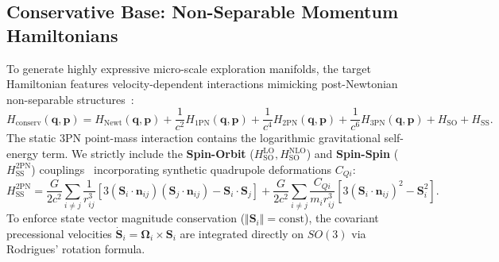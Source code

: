 \documentclass[11pt,a4paper,reqno]{article}
\theoremstyle{plain}
\theoremstyle{definition}
\theoremstyle{remark}
\numberwithin{equation}{section}
\begin{document}
\subsection{Conservative Base: Non-Separable Momentum Hamiltonians}
To generate highly expressive micro-scale exploration manifolds, the target Hamiltonian features velocity-dependent interactions mimicking post-Newtonian non-separable structures~\cite{DamourJaranowskiSchafer2008}:
\begin{equation}
H_{\mathrm{conserv}}(\bm{q}, \bm{p}) = H_{\mathrm{Newt}}(\bm{q}, \bm{p}) + \frac{1}{c^2} H_{\mathrm{1PN}}(\bm{q}, \bm{p}) + \frac{1}{c^4} H_{\mathrm{2PN}}(\bm{q}, \bm{p}) + \frac{1}{c^6} H_{\mathrm{3PN}}(\bm{q}, \bm{p}) + H_{\mathrm{SO}} + H_{\mathrm{SS}}.
\end{equation}
The static 3PN point-mass interaction contains the logarithmic gravitational self-energy term. We strictly include the \textbf{Spin-Orbit} ($H_{\mathrm{SO}}^{\mathrm{LO}}, H_{\mathrm{SO}}^{\mathrm{NLO}}$) and \textbf{Spin-Spin} ($H_{\mathrm{SS}}^{\mathrm{2PN}}$) couplings~\cite{Kidder1995} incorporating synthetic quadrupole deformations $C_{Qi}$:
\begin{equation}
H_{\mathrm{SS}}^{\mathrm{2PN}} = \frac{G}{2 c^2} \sum_{i \neq j} \frac{1}{r_{ij}^3} \left[ 3 (\bm{S}_i \cdot \bm{n}_{ij})(\bm{S}_j \cdot \bm{n}_{ij}) - \bm{S}_i \cdot \bm{S}_j \right] + \frac{G}{2 c^2} \sum_{i \neq j} \frac{C_{Qi}}{m_i r_{ij}^3} \left[ 3 (\bm{S}_i \cdot \bm{n}_{ij})^2 - \bm{S}_i^2 \right].
\end{equation}
To enforce state vector magnitude conservation ($\Vert\bm{S}_i\Vert = \text{const}$), the covariant precessional velocities $\dot{\bm{S}}_i = \bm{\Omega}_i \times \bm{S}_i$ are integrated directly on $SO(3)$ via Rodrigues' rotation formula.
\end{document}
